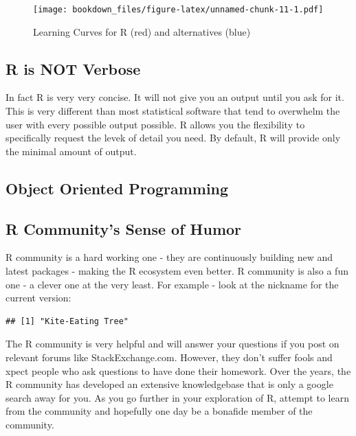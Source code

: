 \documentclass[]{krantz}
\makeatletter
\newenvironment{Shaded}{\begin{snugshade}}{\end{snugshade}}
\newcommand{\OperatorTok}[1]{\textcolor[rgb]{0.81,0.36,0.00}{\textbf{#1}}}
\newcommand{\NormalTok}[1]{#1}
\newenvironment{kframe}{%
\medskip{}
\setlength{\fboxsep}{.8em}
 \def\at@end@of@kframe{}%
 \ifinner\ifhmode%
  \def\at@end@of@kframe{\end{minipage}}%
  \begin{minipage}{\columnwidth}%
 \fi\fi%
 \def\FrameCommand##1{\hskip\@totalleftmargin \hskip-\fboxsep
 \colorbox{shadecolor}{##1}\hskip-\fboxsep
     \hskip-\linewidth \hskip-\@totalleftmargin \hskip\columnwidth}%
 \MakeFramed {\advance\hsize-\width
   \@totalleftmargin\z@ \linewidth\hsize
   \@setminipage}}%
 {\par\unskip\endMakeFramed%
 \at@end@of@kframe}
\renewenvironment{Shaded}{\begin{kframe}}{\end{kframe}}
\theoremstyle{definition}
\theoremstyle{definition}
\theoremstyle{definition}
\theoremstyle{remark}
\makeatother
\begin{document}
\begin{figure}
\centering
\texttt{[image: bookdown\_files/figure-latex/unnamed-chunk-11-1.pdf]}
\caption{\label{fig:unnamed-chunk-11}Learning Curves for R (red) and
alternatives (blue)}
\end{figure}

\subsection{R is NOT Verbose}\label{r-is-not-verbose}

In fact R is very very concise. It will not give you an output until you
ask for it. This is very different than most statistical software that
tend to overwhelm the user with every possible output possible. R allows
you the flexibility to specifically request the levek of detail you
need. By default, R will provide only the minimal amount of output.

\subsection{Object Oriented
Programming}\label{object-oriented-programming}

\subsection{R Community's Sense of
Humor}\label{r-communitys-sense-of-humor}

R community is a hard working one - they are continuously building new
and latest packages - making the R ecosystem even better. R community is
also a fun one - a clever one at the very least. For example - look at
the nickname for the current version:

\begin{Shaded}
\end{Shaded}

\begin{verbatim}
## [1] "Kite-Eating Tree"
\end{verbatim}

The R community is very helpful and will answer your questions if you
post on relevant forums like StackExchange.com. However, they don't
suffer fools and xpect people who ask questions to have done their
homework. Over the years, the R community has developed an extensive
knowledgebase that is only a google search away for you. As you go
further in your exploration of R, attempt to learn from the community
and hopefully one day be a bonafide member of the community.
\end{document}
